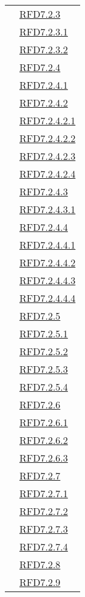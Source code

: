 \begin{longtable}{|>{\centering}m{5cm}|m{5cm}<{\centering}|}
& \hyperlink{RFD7.2.3}{RFD7.2.3}\\
& \hyperlink{RFD7.2.3.1}{RFD7.2.3.1}\\
& \hyperlink{RFD7.2.3.2}{RFD7.2.3.2}\\
& \hyperlink{RFD7.2.4}{RFD7.2.4}\\
& \hyperlink{RFD7.2.4.1}{RFD7.2.4.1}\\
& \hyperlink{RFD7.2.4.2}{RFD7.2.4.2}\\
& \hyperlink{RFD7.2.4.2.1}{RFD7.2.4.2.1}\\
& \hyperlink{RFD7.2.4.2.2}{RFD7.2.4.2.2}\\
& \hyperlink{RFD7.2.4.2.3}{RFD7.2.4.2.3}\\
& \hyperlink{RFD7.2.4.2.4}{RFD7.2.4.2.4}\\
& \hyperlink{RFD7.2.4.3}{RFD7.2.4.3}\\
& \hyperlink{RFD7.2.4.3.1}{RFD7.2.4.3.1}\\
& \hyperlink{RFD7.2.4.4}{RFD7.2.4.4}\\
& \hyperlink{RFD7.2.4.4.1}{RFD7.2.4.4.1}\\
& \hyperlink{RFD7.2.4.4.2}{RFD7.2.4.4.2}\\
& \hyperlink{RFD7.2.4.4.3}{RFD7.2.4.4.3}\\
& \hyperlink{RFD7.2.4.4.4}{RFD7.2.4.4.4}\\
& \hyperlink{RFD7.2.5}{RFD7.2.5}\\
& \hyperlink{RFD7.2.5.1}{RFD7.2.5.1}\\
& \hyperlink{RFD7.2.5.2}{RFD7.2.5.2}\\
& \hyperlink{RFD7.2.5.3}{RFD7.2.5.3}\\
& \hyperlink{RFD7.2.5.4}{RFD7.2.5.4}\\
& \hyperlink{RFD7.2.6}{RFD7.2.6}\\
& \hyperlink{RFD7.2.6.1}{RFD7.2.6.1}\\
& \hyperlink{RFD7.2.6.2}{RFD7.2.6.2}\\
& \hyperlink{RFD7.2.6.3}{RFD7.2.6.3}\\
& \hyperlink{RFD7.2.7}{RFD7.2.7}\\
& \hyperlink{RFD7.2.7.1}{RFD7.2.7.1}\\
& \hyperlink{RFD7.2.7.2}{RFD7.2.7.2}\\
& \hyperlink{RFD7.2.7.3}{RFD7.2.7.3}\\
& \hyperlink{RFD7.2.7.4}{RFD7.2.7.4}\\
& \hyperlink{RFD7.2.8}{RFD7.2.8}\\
& \hyperlink{RFD7.2.9}{RFD7.2.9}\\

\end{longtable}
